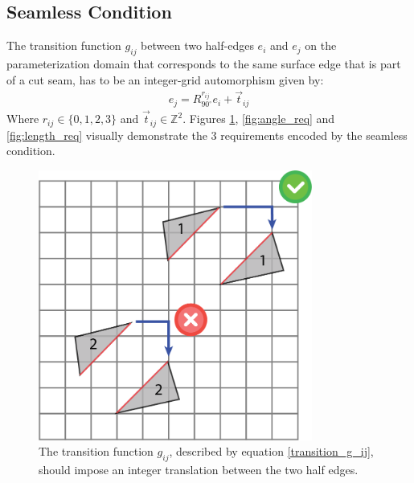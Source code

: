 \subsection{Seamless Condition}
\label{label:seamless_cond}
The transition function $g_{ij}$ between two half-edges $e_i$ and $e_j$ on the parameterization domain that corresponds to the same surface edge that is part of a cut seam, has to be an integer-grid automorphism given by:
\begin{equation}\label{transition_g_ij}
\begin{split}
e_j = R^{r_{ij}}_{90^\circ}e_i + \vec{t}_{ij}
\end{split}
\end{equation}
Where  $r_{ij} \in \{0,1,2,3\}$ and $\vec{t}_{ij} \in \mathbb{Z}^2$. Figures \ref{fig:translation_req}, \ref{fig:angle_req} and \ref{fig:length_req} visually demonstrate the 3 requirements encoded by the seamless condition.
\begin{figure}[ht]
\centering
\includegraphics[width=9cm]{figures/seamless/translation.png}
\caption[The Translation Requirement]{The transition function $g_{ij}$, described by equation \ref{transition_g_ij}, should impose an integer translation between the two half edges.}
\label{fig:translation_req}
\end{figure}
